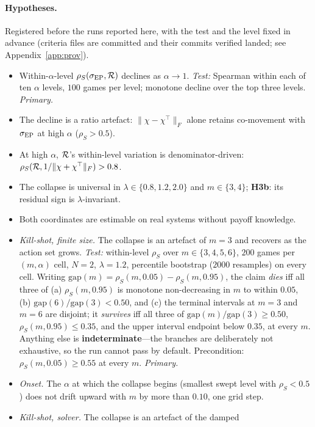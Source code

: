 \paragraph{Hypotheses.} Registered before the runs reported here, with the test and the
level fixed in advance (criteria files are committed and their commits verified landed;
see Appendix~\ref{app:prov}).
\begin{itemize}
\item[\textbf{H1}] Within-$\alpha$-level $\rho_S(\sigma_{\mathrm{EP}},\mathcal{R})$ declines as $\alpha\to1$.
\emph{Test:} Spearman within each of ten $\alpha$ levels, $100$ games per level; monotone
decline over the top three levels. \emph{Primary.}
\item[\textbf{H2a}] The decline is a ratio artefact: $\|\chi-\chi^{\top}\|_F$ alone retains
co-movement with $\sigma_{\mathrm{EP}}$ at high $\alpha$ ($\rho_S>0.5$).
\item[\textbf{H2b}] At high $\alpha$, $\mathcal{R}$'s within-level variation is denominator-driven:
$\rho_S(\mathcal{R},1/\|\chi+\chi^{\top}\|_F)>0.8$.
\item[\textbf{H3}] The collapse is universal in $\lambda\in\{0.8,1.2,2.0\}$ and
$m\in\{3,4\}$; \textbf{H3b}: its residual sign is $\lambda$-invariant.
\item[\textbf{H4}] Both coordinates are estimable on real systems without payoff knowledge.
\item[\textbf{H5}] \emph{Kill-shot, finite size.} The collapse is an artefact of $m=3$ and
recovers as the action set grows. \emph{Test:} within-level $\rho_S$ over
$m\in\{3,4,5,6\}$, $200$ games per $(m,\alpha)$ cell, $N=2$, $\lambda=1.2$, percentile
bootstrap ($2000$ resamples) on every cell. Writing
$\mathrm{gap}(m)=\rho_S(m,0.05)-\rho_S(m,0.95)$, the claim \emph{dies} iff all three of
(a) $\rho_S(m,0.95)$ is monotone non-decreasing in $m$ to within $0.05$, (b)
$\mathrm{gap}(6)/\mathrm{gap}(3)<0.50$, and (c) the terminal intervals at $m=3$ and $m=6$
are disjoint; it \emph{survives} iff all three of $\mathrm{gap}(m)/\mathrm{gap}(3)\ge0.50$,
$\rho_S(m,0.95)\le0.35$, and the upper interval endpoint below $0.35$, at every $m$.
Anything else is \textbf{indeterminate}---the branches are deliberately not exhaustive, so
the run cannot pass by default. Precondition: $\rho_S(m,0.05)\ge0.55$ at every $m$.
\emph{Primary.}
\item[\textbf{H5b}] \emph{Onset.} The $\alpha$ at which the collapse begins (smallest
swept level with $\rho_S<0.5$) does not drift upward with $m$ by more than $0.10$, one grid
step.
\item[\textbf{H6}] \emph{Kill-shot, solver.} The collapse is an artefact of the damped

\end{itemize}
